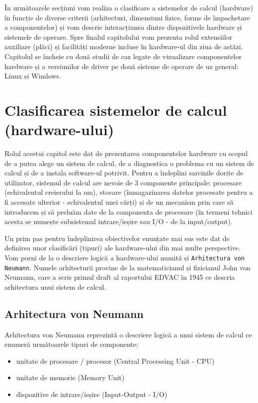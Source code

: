 În următoarele secțiuni vom realiza o clasificare a sistemelor de calcul
(hardware) în funcție de diverse criterii (arhitecturi, dimensiuni fizice, forme
de împachetare a componentelor) și vom descrie interacțiunea dintre
dispozitivele hardware și sistemele de operare. Spre finalul capitolului vom
prezenta rolul extensiilor auxiliare (plăci) și facilități moderne incluse în
hardware-ul din ziua de astăzi. Capitolul se încheie cu două studii de caz
legate de vizualizare componentelor hardware și a versiunilor de driver pe două
sisteme de operare de uz general: Linux și Windows.

\section{Clasificarea sistemelor de calcul (hardware-ului)}
\label{sec:hw:class}

Rolul acestui capitol este dat de prezentarea componentelor hardware cu scopul
de a putea alege un sistem de calcul, de a diagnostica o problema cu un sistem de
calcul și de a instala software-ul potrivit. Pentru a îndeplini sarcinile dorite de utilizator, sistemul de calcul are nevoie de 3
componente principale: procesare (echivalentul creierului la om), stocare
(înmagazinarea datelor procesate pentru a fi accesate ulterior - echivalentul
unei cărți) și de un mecanism prin care să introducem și să preluăm date de la
componenta de procesare (în termeni tehnici acesta se numește subsistemul
intrare/ieșire sau I/O - de la input/output).

Un prim pas pentru îndeplinirea obiectivelor enunțate mai sus este dat de
definirea unor clasificări (tipuri) ale hardware-ului din mai multe perspective.
Vom porni de la o descriere logică a hardware-ului numită și \texttt{Arhitectura
von Neumann}. Numele arhitecturii provine de la matematicianul și fizicianul
John von Neumann, care a scris primul draft al raportului EDVAC
 în 1945 ce
descria arhitectura unui sistem de calcul.

\subsection{Arhitectura von Neumann}
\label{sec:hw:class:von-neumann}

Arhitectura von Neumann reprezintă o descriere logică a unui sistem de calcul ce
enumeră următoarele tipuri de componente:

\begin{itemize}
  \item unitate de procesare / procesor (Central Processing Unit - CPU)
              \item unitate de memorie (Memory Unit) 
	\item dispozitive de intrare/ieșire (Input-Output - I/O)
\end{itemize}

